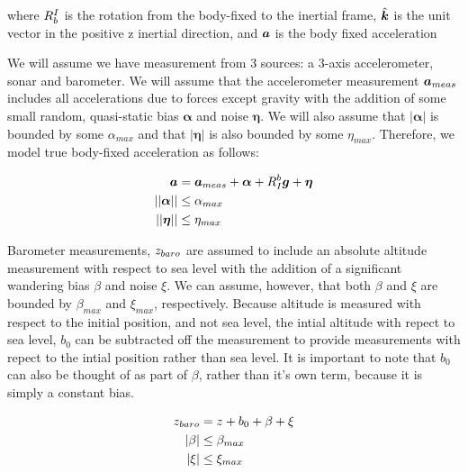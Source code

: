 \documentclass[paper=a4, fontsize=11pt]{scrartcl} %
\numberwithin{equation}{section} %
\numberwithin{figure}{section} %
\numberwithin{table}{section} %
\begin{document}
where $R_b^I$ is the rotation from the body-fixed to the inertial frame, $\hat{\bm{k}}$ is the unit vector in the positive z inertial direction, and $\bm{a}$ is the body fixed acceleration

We will assume we have measurement from 3 sources: a 3-axis accelerometer, sonar and barometer.  
We will assume that the accelerometer measurement $\bm{a}_{meas}$ includes all accelerations due to forces except gravity with the addition of some small random, quasi-static bias $\bm{\alpha}$ and noise $\bm{\eta}$.
We will also assume that $\vert\bm{\alpha}\vert$ is bounded by some $\alpha_{max}$ and that $\vert\bm{\eta}\vert$ is also bounded by some $\eta_{max}$. 
Therefore, we model true body-fixed acceleration as follows:

\begin{equation}
\begin{aligned}
	\bm{a} &= \bm{a}_{meas} + \bm{\alpha} + R_I^b\bm{g} + \bm{\eta} \\
	\vert\vert \bm{\alpha} \vert\vert &\leq \alpha_{max} \\
	\vert\vert \bm{\eta} \vert\vert &\leq \eta_{max} \\
\end{aligned}
\label{eq:accel_model}
\end{equation}

\newcommand{\zbaro}{\z_{baro}}

Barometer measurements, $\zbaro$ are assumed to include an absolute altitude measurement with respect to sea level with the addition of a significant wandering bias $\beta$ and noise $\xi$.  We can assume, however, that both $\beta$ and $\xi$ are bounded by $\beta_{max}$ and $\xi_{max}$, respectively.  Because altitude is measured with respect to the initial position, and not sea level, the intial altitude with repect to sea level, $b_0$ can be subtracted off the measurement to provide measurements with repect to the intial position rather than sea level.  It is important to note that $b_0$ can also be thought of as part of $\beta$, rather than it's own term, because it is simply a constant bias.

\begin{equation}
\begin{aligned}
	\zbaro &= z + b_0 + \beta + \xi \\
	\vert \beta \vert  &\leq \beta_{max} \\
	\vert \xi \vert &\leq \xi_{max}
\end{aligned} 
\end{equation} 
\end{document}
